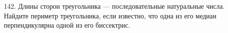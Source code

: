 142. Длины сторон треугольника --- последовательные натуральные числа. Найдите периметр треугольника, если известно, что одна из его медиан перпендикулярна одной из его биссектрис.\\
